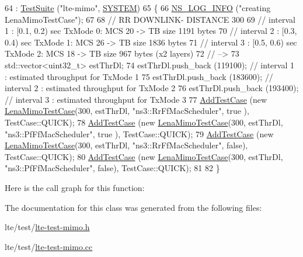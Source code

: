 \begin{DoxyCode}
64   : \hyperlink{classns3_1_1TestSuite_a904b0c40583b744d30908aeb94636d1a}{TestSuite} (\textcolor{stringliteral}{"lte-mimo"}, \hyperlink{classns3_1_1TestSuite_a1ebfcab34ec8161e085e8e3a1855eae0a90c5529a26ab3a5ffcc6e57040dbd82e}{SYSTEM})
65 \{
66   \hyperlink{group__logging_gafbd73ee2cf9f26b319f49086d8e860fb}{NS\_LOG\_INFO} (\textcolor{stringliteral}{"creating LenaMimoTestCase"});
67 
68   \textcolor{comment}{// RR DOWNLINK- DISTANCE 300}
69   \textcolor{comment}{// interval 1 : [0.1, 0.2) sec TxMode 0: MCS 20 -> TB size 1191 bytes}
70   \textcolor{comment}{// interval 2 : [0.3, 0.4) sec TxMode 1: MCS 26 -> TB size 1836 bytes}
71   \textcolor{comment}{// interval 3 : [0.5, 0.6) sec TxMode 2: MCS 18 -> TB size  967 bytes (x2 layers)}
72   \textcolor{comment}{// --> }
73   std::vector<uint32\_t> estThrDl;
74   estThrDl.push\_back (119100); \textcolor{comment}{// interval 1 : estimated throughput for TxMode 1}
75   estThrDl.push\_back (183600); \textcolor{comment}{// interval 2 : estimated throughput for TxMode 2}
76   estThrDl.push\_back (193400); \textcolor{comment}{// interval 3 : estimated throughput for TxMode 3}
77   \hyperlink{classns3_1_1TestCase_a3718088e3eefd5d6454569d2e0ddd835}{AddTestCase} (\textcolor{keyword}{new} \hyperlink{classLenaMimoTestCase}{LenaMimoTestCase}(300, estThrDl, \textcolor{stringliteral}{"ns3::RrFfMacScheduler"}, \textcolor{keyword}{true}
      ), TestCase::QUICK);
78   \hyperlink{classns3_1_1TestCase_a3718088e3eefd5d6454569d2e0ddd835}{AddTestCase} (\textcolor{keyword}{new} \hyperlink{classLenaMimoTestCase}{LenaMimoTestCase}(300, estThrDl, \textcolor{stringliteral}{"ns3::PfFfMacScheduler"}, \textcolor{keyword}{true}
      ), TestCase::QUICK);
79   \hyperlink{classns3_1_1TestCase_a3718088e3eefd5d6454569d2e0ddd835}{AddTestCase} (\textcolor{keyword}{new} \hyperlink{classLenaMimoTestCase}{LenaMimoTestCase}(300, estThrDl, \textcolor{stringliteral}{"ns3::RrFfMacScheduler"}, \textcolor{keyword}{
      false}), TestCase::QUICK);
80   \hyperlink{classns3_1_1TestCase_a3718088e3eefd5d6454569d2e0ddd835}{AddTestCase} (\textcolor{keyword}{new} \hyperlink{classLenaMimoTestCase}{LenaMimoTestCase}(300, estThrDl, \textcolor{stringliteral}{"ns3::PfFfMacScheduler"}, \textcolor{keyword}{
      false}), TestCase::QUICK);
81 
82 \}
\end{DoxyCode}


Here is the call graph for this function\+:




The documentation for this class was generated from the following files\+:\begin{DoxyCompactItemize}
\item 
lte/test/\hyperlink{lte-test-mimo_8h}{lte-\/test-\/mimo.\+h}\item 
lte/test/\hyperlink{lte-test-mimo_8cc}{lte-\/test-\/mimo.\+cc}\end{DoxyCompactItemize}
